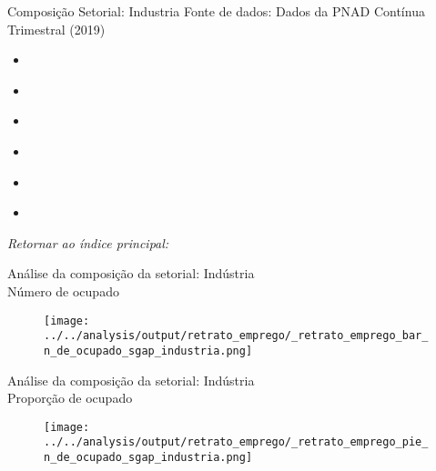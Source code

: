 \begin{frame}[label=_retrato_emprego_sgap_industria]{Composição Setorial: Industria}
{\footnotesize Fonte de dados: Dados da PNAD Contínua Trimestral (2019)}

\begin{itemize}
\item{
	\hyperlink{_retrato_emprego_bar_n_de_ocupado_sgap_industria}{}
	}
\item{
	\hyperlink{_retrato_emprego_pie_n_de_ocupado_sgap_industria}{}
	} 
\item{
	\hyperlink{_retrato_emprego_bar_n_de_formal_sgap_industria}{}
	} 
\item{
	\hyperlink{_retrato_emprego_pie_n_de_formal_sgap_industria}{}
	} 
\item{
	\hyperlink{_retrato_emprego_bar_n_de_informal_sgap_industria}{}
	} 	
\item{	
	\hyperlink{_retrato_emprego_pie_n_de_informal_sgap_industria}{}
	} 		

\end{itemize}
\begin{small}
\textit{Retornar ao índice principal: \hyperlink{indice_principal}{} }
\end{small}
\end{frame}


\begin{frame}[label=_retrato_emprego_bar_n_de_ocupado_sgap_industria]{{\small Análise da composição da setorial: Indústria \\  Número de ocupado}}
\textit{\hyperlink{_retrato_emprego_sgap_industria}{}}
\begin{figure}
  \centering
  \texttt{[image: ../../analysis/output/retrato\_emprego/\_retrato\_emprego\_bar\_n\_de\_ocupado\_sgap\_industria.png]}
  \caption{}
  \label{fig:_retrato_emprego_bar_n_de_ocupado_sgap_industria}
\end{figure}
\end{frame}


\begin{frame}[label=_retrato_emprego_pie_n_de_ocupado_sgap_industria]{{\small Análise da composição da setorial: Indústria \\  Proporção de ocupado}}
\textit{\hyperlink{_retrato_emprego_sgap_industria}{}}
\begin{figure}
  \centering
  \texttt{[image: ../../analysis/output/retrato\_emprego/\_retrato\_emprego\_pie\_n\_de\_ocupado\_sgap\_industria.png]}
  \caption{}
  \label{fig:_retrato_emprego_pie_n_de_ocupado_sgap_industria}
\end{figure}
\end{frame}


